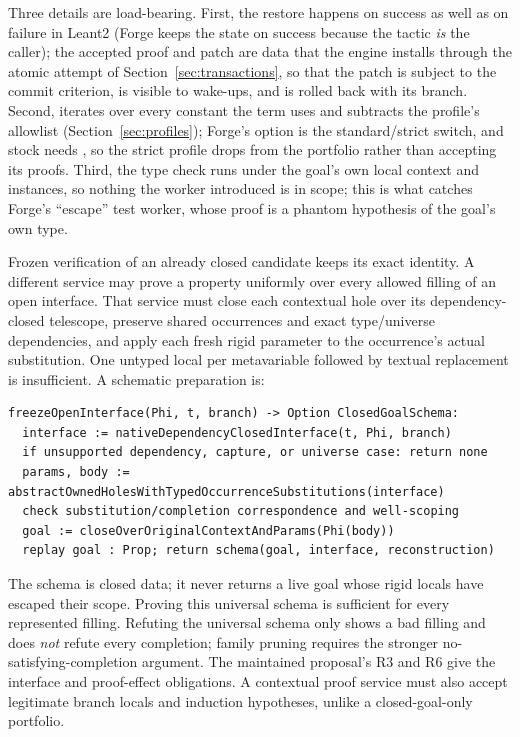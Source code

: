 Three details are load-bearing. First, the restore happens on success as well as on failure in Leant2 (Forge keeps the state on success because the tactic \emph{is} the caller); the accepted proof and patch are data that the engine installs through the atomic attempt of Section~\ref{sec:transactions}, so that the patch is subject to the commit criterion, is visible to wake-ups, and is rolled back with its branch. Second,  iterates  over every constant the term uses and subtracts the profile's allowlist (Section~\ref{sec:profiles}); Forge's  option is the standard/strict switch, and stock  needs , so the strict profile drops  from the portfolio rather than accepting its proofs\cite{forge}. Third, the type check runs under the goal's own local context and instances, so nothing the worker introduced is in scope; this is what catches Forge's ``escape'' test worker, whose proof is a phantom hypothesis of the goal's own type.

Frozen verification of an already closed candidate keeps its exact identity. A different service may prove a property uniformly over every allowed filling of an open interface. That service must close each contextual hole over its dependency-closed telescope, preserve shared occurrences and exact type/universe dependencies, and apply each fresh rigid parameter to the occurrence's actual substitution. One untyped local per metavariable followed by textual replacement is insufficient. A schematic preparation is:
\begin{lstlisting}
freezeOpenInterface(Phi, t, branch) -> Option ClosedGoalSchema:
  interface := nativeDependencyClosedInterface(t, Phi, branch)
  if unsupported dependency, capture, or universe case: return none
  params, body := abstractOwnedHolesWithTypedOccurrenceSubstitutions(interface)
  check substitution/completion correspondence and well-scoping
  goal := closeOverOriginalContextAndParams(Phi(body))
  replay goal : Prop; return schema(goal, interface, reconstruction)
\end{lstlisting}
The schema is closed data; it never returns a live goal whose rigid locals have escaped their scope. Proving this universal schema is sufficient for every represented filling. Refuting the universal schema only shows a bad filling and does \emph{not} refute every completion; family pruning requires the stronger no-satisfying-completion argument. The maintained proposal's R3 and R6 give the interface and proof-effect obligations. A contextual proof service must also accept legitimate branch locals and induction hypotheses, unlike a closed-goal-only portfolio.

